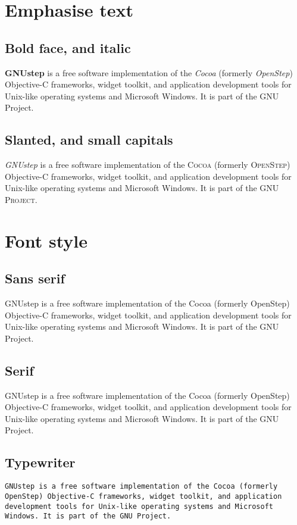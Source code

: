 \documentclass{article}
\begin{document}
\section{Emphasise text}
\subsection{Bold face, and italic}
\textbf{GNUstep} is a free software implementation of the \textit{Cocoa} (formerly
\textit{OpenStep}) Objective-C frameworks, widget toolkit, and application
development tools for Unix-like operating systems and Microsoft Windows.
It is part of the GNU Project.

\subsection{Slanted, and small capitals}
\textsl{GNUstep} is a free software implementation of the \textsc{Cocoa} (formerly
\textsc{OpenStep}) Objective-C frameworks, widget toolkit, and application
development tools for Unix-like operating systems and Microsoft Windows.
It is part of the \textsc{GNU Project}.

\section{Font style}
\subsection{Sans serif}
\textsf{GNUstep is a free software implementation of the Cocoa (formerly
OpenStep) Objective-C frameworks, widget toolkit, and application
development tools for Unix-like operating systems and Microsoft Windows.
It is part of the GNU Project.}

\subsection{Serif}
\textrm{GNUstep is a free software implementation of the Cocoa (formerly
OpenStep) Objective-C frameworks, widget toolkit, and application
development tools for Unix-like operating systems and Microsoft Windows.
It is part of the GNU Project.}

\subsection{Typewriter}
\texttt{GNUstep is a free software implementation of the Cocoa (formerly
OpenStep) Objective-C frameworks, widget toolkit, and application
development tools for Unix-like operating systems and Microsoft Windows.
It is part of the GNU Project.}

\end{document}
